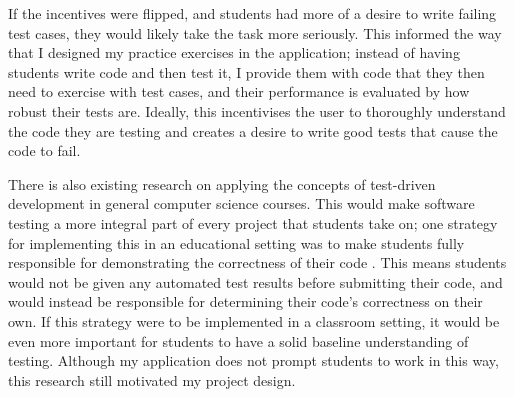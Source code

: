 \documentclass[10pt,twocolumn]{article}
\begin{document}
If the incentives were flipped, and students had 
more of a desire to write failing test cases, they would likely take the task more seriously. This informed the way that 
I designed my practice exercises in the application; instead of having students write code and then test it, I 
provide them with code that they then need to exercise with test cases, and their performance is
evaluated by how robust their tests are. Ideally, this incentivises the user to thoroughly understand the code they are
testing and creates a desire to write good tests that cause the code to fail. 

There is also existing research on applying the concepts of test-driven development in general computer science courses. 
This would make software testing a more integral part of every project that students take 
on; one strategy for implementing this in an 
educational setting was to make students fully responsible for demonstrating the correctness of their code 
\cite{Edwards2003Article1}. This means students would not be given any automated test results before 
submitting their code, and would instead be responsible for determining their code's correctness on their own. If this 
strategy were to be implemented in a classroom setting, it would be even more important for students to have a solid 
baseline understanding of testing. Although my application does not prompt students to work in this way, this research 
still motivated my project design. 


\end{document}
